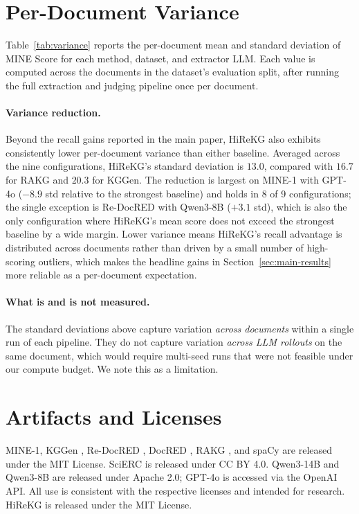 \documentclass[11pt]{article}
\begin{document}
\section{Per-Document Variance}
\label{app:variance}



Table~\ref{tab:variance} reports the per-document mean and standard deviation of MINE Score for each method, dataset, and extractor LLM. Each value is computed across the documents in the dataset's evaluation split, after running the full extraction and judging pipeline once per document.


\paragraph{Variance reduction.} Beyond the recall gains reported in the main paper, HiReKG also exhibits consistently lower per-document variance than either baseline. Averaged across the nine configurations, HiReKG's standard deviation is $13.0$, compared with $16.7$ for RAKG and $20.3$ for KGGen. The reduction is largest on MINE-1 with GPT-4o ($-8.9$ std relative to the strongest baseline) and holds in 8 of 9 configurations; the single exception is Re-DocRED with Qwen3-8B ($+3.1$ std), which is also the only configuration where HiReKG's mean score does not exceed the strongest baseline by a wide margin. Lower variance means HiReKG's recall advantage is distributed across documents rather than driven by a small number of high-scoring outliers, which makes the headline gains in Section~\ref{sec:main-results} more reliable as a per-document expectation.

\paragraph{What is and is not measured.} The standard deviations above capture variation \emph{across documents} within a single run of each pipeline. They do not capture variation \emph{across LLM rollouts} on the same document, which would require multi-seed runs that were not feasible under our compute budget. We note this as a limitation.


\section{Artifacts and Licenses}
\label{app:licenses}
MINE-1, KGGen \citep{kggen}, Re-DocRED \citep{redocred}, DocRED \citep{docred}, RAKG \citep{rakg}, and spaCy are released under the MIT License. SciERC \citep{scierc} is released under CC BY 4.0. Qwen3-14B and Qwen3-8B \citep{qwen3_14b, qwen3_8b} are released under Apache 2.0; GPT-4o \citep{gpt4o} is accessed via the OpenAI API. All use is consistent with the respective licenses and intended for research. HiReKG is released under the MIT License.
\end{document}
